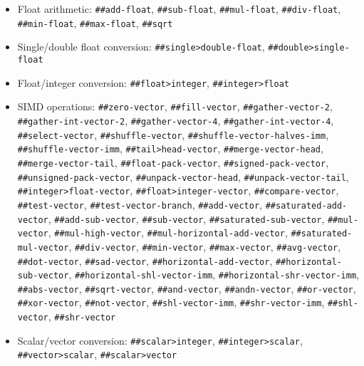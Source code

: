 \begin{itemize}
\item
\begin{flushleft}
Float arithmetic:
\Verb|##add-float|,
\Verb|##sub-float|,
\Verb|##mul-float|,
\Verb|##div-float|,
\Verb|##min-float|,
\Verb|##max-float|,
\Verb|##sqrt|
\end{flushleft}

\item
\begin{flushleft}
Single/double float conversion:
\Verb|##single>double-float|,
\Verb|##double>single-float|
\end{flushleft}

\item
\begin{flushleft}
Float/integer conversion:
\Verb|##float>integer|,
\Verb|##integer>float|
\end{flushleft}

\item
\begin{flushleft}
\Gls{SIMD} operations:
\Verb|##zero-vector|,
\Verb|##fill-vector|,
\Verb|##gather-vector-2|,
\Verb|##gather-int-vector-2|,
\Verb|##gather-vector-4|,
\Verb|##gather-int-vector-4|,
\Verb|##select-vector|,
\Verb|##shuffle-vector|,
\Verb|##shuffle-vector-halves-imm|,
\Verb|##shuffle-vector-imm|,
\Verb|##tail>head-vector|,
\Verb|##merge-vector-head|,
\Verb|##merge-vector-tail|,
\Verb|##float-pack-vector|,
\Verb|##signed-pack-vector|,
\Verb|##unsigned-pack-vector|,
\Verb|##unpack-vector-head|,
\Verb|##unpack-vector-tail|,
\Verb|##integer>float-vector|,
\Verb|##float>integer-vector|,
\Verb|##compare-vector|,
\Verb|##test-vector|,
\Verb|##test-vector-branch|,
\Verb|##add-vector|,
\Verb|##saturated-add-vector|,
\Verb|##add-sub-vector|,
\Verb|##sub-vector|,
\Verb|##saturated-sub-vector|,
\Verb|##mul-vector|,
\Verb|##mul-high-vector|,
\Verb|##mul-horizontal-add-vector|,
\Verb|##saturated-mul-vector|,
\Verb|##div-vector|,
\Verb|##min-vector|,
\Verb|##max-vector|,
\Verb|##avg-vector|,
\Verb|##dot-vector|,
\Verb|##sad-vector|,
\Verb|##horizontal-add-vector|,
\Verb|##horizontal-sub-vector|,
\Verb|##horizontal-shl-vector-imm|,
\Verb|##horizontal-shr-vector-imm|,
\Verb|##abs-vector|,
\Verb|##sqrt-vector|,
\Verb|##and-vector|,
\Verb|##andn-vector|,
\Verb|##or-vector|,
\Verb|##xor-vector|,
\Verb|##not-vector|,
\Verb|##shl-vector-imm|,
\Verb|##shr-vector-imm|,
\Verb|##shl-vector|,
\Verb|##shr-vector|
\end{flushleft}

\item
\begin{flushleft}
Scalar/vector conversion:
\Verb|##scalar>integer|,
\Verb|##integer>scalar|,
\Verb|##vector>scalar|,
\Verb|##scalar>vector|
\end{flushleft}


\end{itemize}
